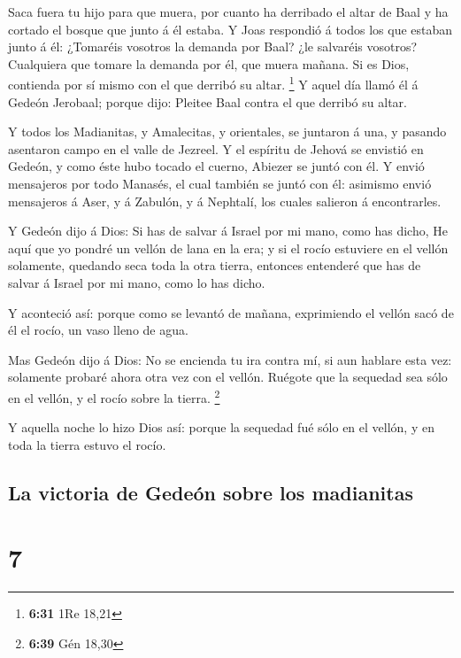  Saca fuera tu hijo para que muera, por cuanto ha
derribado el altar de Baal y ha cortado el bosque que junto á él estaba.
 Y Joas respondió á todos los que estaban junto á él:
¿Tomaréis vosotros la demanda por Baal? ¿le salvaréis vosotros?
Cualquiera que tomare la demanda por él, que muera mañana. Si es Dios,
contienda por sí mismo con el que derribó su altar. \footnote{\textbf{6:31}
  1Re 18,21}  Y aquel día llamó él á Gedeón Jerobaal;
porque dijo: Pleitee Baal contra el que derribó su altar.

 Y todos los Madianitas, y Amalecitas, y orientales, se
juntaron á una, y pasando asentaron campo en el valle de Jezreel.
 Y el espíritu de Jehová se envistió en Gedeón, y como
éste hubo tocado el cuerno, Abiezer se juntó con él.  Y
envió mensajeros por todo Manasés, el cual también se juntó con él:
asimismo envió mensajeros á Aser, y á Zabulón, y á Nephtalí, los cuales
salieron á encontrarles.

 Y Gedeón dijo á Dios: Si has de salvar á Israel por mi
mano, como has dicho,  He aquí que yo pondré un vellón de
lana en la era; y si el rocío estuviere en el vellón solamente, quedando
seca toda la otra tierra, entonces entenderé que has de salvar á Israel
por mi mano, como lo has dicho.

 Y aconteció así: porque como se levantó de mañana,
exprimiendo el vellón sacó de él el rocío, un vaso lleno de agua.

 Mas Gedeón dijo á Dios: No se encienda tu ira contra mí,
si aun hablare esta vez: solamente probaré ahora otra vez con el vellón.
Ruégote que la sequedad sea sólo en el vellón, y el rocío sobre la
tierra. \footnote{\textbf{6:39} Gén 18,30}

 Y aquella noche lo hizo Dios así: porque la sequedad fué
sólo en el vellón, y en toda la tierra estuvo el rocío.

\hypertarget{la-victoria-de-gedeuxf3n-sobre-los-madianitas}{%
\subsection{La victoria de Gedeón sobre los
madianitas}\label{la-victoria-de-gedeuxf3n-sobre-los-madianitas}}

\hypertarget{section-6}{%
\section{7}\label{section-6}}

